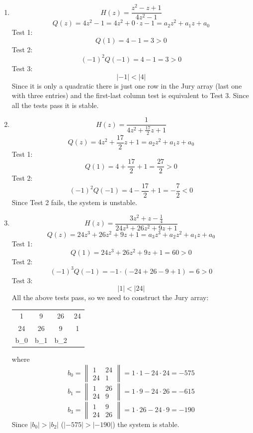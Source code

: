 \documentclass{article}
\begin{document}
\begin{enumerate}
\item
  \[
  H(z) = \frac{z^2 -z + 1}{4z^2 - 1}
  \]
  \[
  Q(z) = 4z^2 - 1 = 4z^2 + 0\cdot z - 1 = a_2 z^2 + a_1 z + a_0
  \]
  Test 1:
  \[
  Q(1) = 4 - 1 = 3 > 0  
  \]
  Test 2:
  \[
  (-1)^2 Q(-1) = 4 - 1 = 3 > 0  
  \]
  Test 3:
  \[
  |-1| < |4|  
  \]
  Since it is only a quadratic there is just one row in the Jury array (last one with three entries) and the first-last column test is equivalent to Test 3. Since all the tests pass it is stable.

\item
  \[
  H(z) = \frac{1}{4z^2 +\frac{17}{2}z + 1}
  \]
  \[
  Q(z) = 4z^2 +\frac{17}{2}z + 1 = a_2 z^2 + a_1 z + a_0
  \]
  Test 1:
  \[
  Q(1) = 4 + \frac{17}{2} + 1 = \frac{27}{2} > 0  
  \]
  Test 2:
  \[
  (-1)^2 Q(-1) = 4 - \frac{17}{2} + 1 = -\frac{7}{2} < 0  
  \]
  Since Test 2 fails, the system is unstable.

  \item
  \[
  H(z) = \frac{3z^2 + z - \frac{1}{4}}{24z^3 + 26z^2 + 9z + 1}
  \]
  \[
  Q(z) = 24z^3 + 26z^2 + 9z + 1 = a_3 z^3 + a_2 z^2 + a_1 z + a_0
  \]
  Test 1:
  \[
  Q(1) = 24z^3 + 26z^2 + 9z + 1 = 60 > 0  
  \]
  Test 2:
  \[
  (-1)^3 Q(-1) = -1 \cdot (-24 + 26 - 9 + 1) = 6 > 0  
  \]
  Test 3:
  \[
  |1| < |24|  
  \]
  All the above tests pass, so we need to construct the Jury array:

  \begin{center}
  \begin{tabular}{|cccc}
    \hline
    1 & 9 & 26 & 24\\
    24 & 26 & 9 & 1\\
    b_0 & b_1 & b_2 &
  \end{tabular}
  \end{center}

  where
  \[
  b_0 = \left\lVert \begin{array}{cc}
  1 & 24\\
  24 & 1
  \end{array}\right\rVert = 1\cdot 1 - 24\cdot 24 = -575
  \]
  \[
  b_1 = \left\lVert \begin{array}{cc}
  1 & 26\\
  24 & 9
  \end{array}\right\rVert = 1\cdot 9 - 24\cdot 26 = -615
  \]
  \[
  b_3 = \left\lVert \begin{array}{cc}
  1 & 9\\
  24 & 26
  \end{array}\right\rVert = 1\cdot 26 - 24\cdot 9 = -190
  \]
  Since $|b_0| > |b_{2}|$ ($|-575| > |-190|$) the system is stable.
\end{enumerate}
\end{document}
